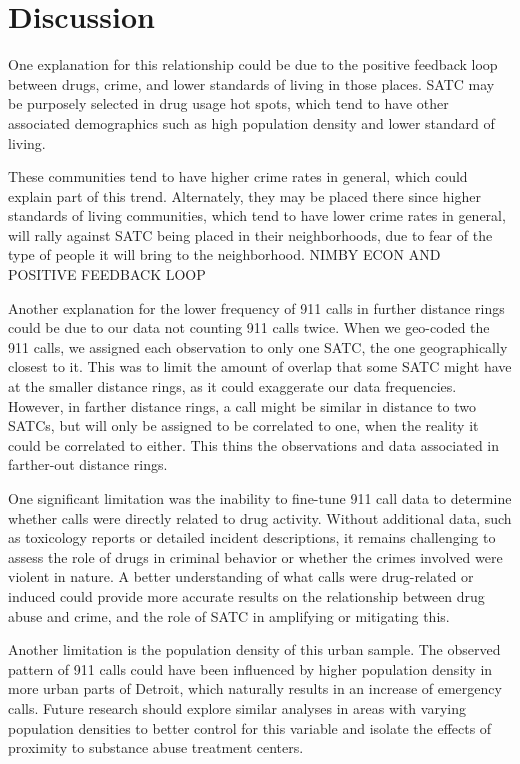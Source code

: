 \documentclass[12pt]{article}
\begin{document}


\section{Discussion}
\label{sec:discussion}

One explanation for this relationship could be due to the positive feedback loop between drugs, crime, and lower standards of living in those places. SATC may be purposely selected in drug usage hot spots, which tend to have other associated demographics such as high population density and lower standard of living. 

These communities tend to have higher crime rates in general, which could explain part of this trend. Alternately, they may be placed there since higher standards of living communities, which tend to have lower crime rates in general, will rally against SATC being placed in their neighborhoods, due to fear of the type of people it will bring to the neighborhood. NIMBY ECON AND POSITIVE FEEDBACK LOOP
    
Another explanation for the lower frequency of 911 calls in further distance rings could be due to our data not counting 911 calls twice. When we geo-coded the 911 calls, we assigned each observation to only one SATC, the one geographically closest to it. This was to limit the amount of overlap that some SATC might have at the smaller distance rings, as it could exaggerate our data frequencies. However, in farther distance rings, a call might be similar in distance to two SATCs, but will only be assigned to be correlated to one, when the reality it could be correlated to either. This thins the observations and data associated in farther-out distance rings. 

One significant limitation was the inability to fine-tune 911 call data to determine whether calls were directly related to drug activity. Without additional data, such as toxicology reports or detailed incident descriptions, it remains challenging to assess the role of drugs in criminal behavior or whether the crimes involved were violent in nature. A better understanding of what calls were drug-related or induced could provide more accurate results on the relationship between drug abuse and crime, and the role of SATC in amplifying or mitigating this. 
    
Another limitation is the population density of this urban sample. The observed pattern of 911 calls could have been influenced by higher population density in more urban parts of Detroit, which naturally results in an increase of emergency calls. Future research should explore similar analyses in areas with varying population densities to better control for this variable and isolate the effects of proximity to substance abuse treatment centers. 
\end{document}
